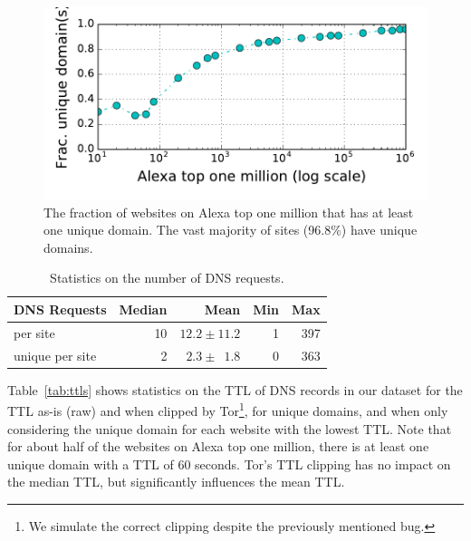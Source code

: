 \begin{figure}[t]
	\centering
	\includegraphics[width=0.7\linewidth]{figures/dns-unique-domains.pdf}
	\caption{The fraction of websites on Alexa top one million that has at least
	one unique domain. The vast majority of sites (96.8\%) have unique domains.}
	\label{fig:unique-domains}
\end{figure}

\begin{table}[t]
	\centering
	\caption{Statistics on the number of DNS requests.}
	\begin{tabular}{l r r r r}
	\toprule
	\textbf{DNS Requests} & \textbf{Median} & \textbf{Mean} & \textbf{Min} & \textbf{Max} \\
	\midrule
	per site & 10 & $12.2\pm11.2$ & 1 & 397 \\
	unique per site & 2 & $2.3\pm\phantom{0}1.8$ & 0 & 363 \\
	\bottomrule
	\end{tabular}
	\label{tab:dns-requests}
\end{table}

Table~\ref{tab:ttls} shows statistics on the TTL of DNS records in our dataset
for the TTL as-is (raw) and when clipped by Tor\footnote{We simulate the
correct clipping despite the previously mentioned bug.}, for unique domains,
and when
only considering the unique domain for each website with the lowest TTL.
Note that for about half of the websites on Alexa top one million, there is at
least one unique domain with a TTL of 60 seconds. Tor's TTL clipping has no
impact on the median TTL, but significantly influences the mean TTL.

